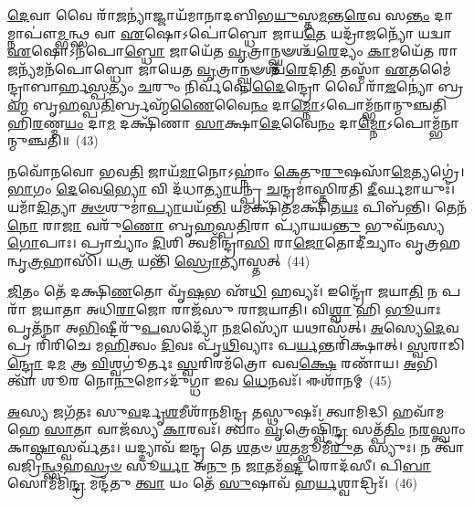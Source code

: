 {\anuvakamend[{\-\ul{𑌪𑍍𑌰}\-\-\ul{𑌵}\-𑌣𑌂 𑌵𑌿\-\ul{𑌷𑍍𑌣𑍁}\-𑌰𑍍𑌵𑌾 \ul{𑌇}\-𑌦\-\ul{𑌮𑌿}\-𑌦\-\ul{𑌮}\-𑌹𑌂 𑌯𑍋 𑌭᳴\-\ul{𑌵}\-𑌤𑍍𑌯𑍇𑌕᳴𑌵𑌿𑍞𑌶𑌤𑌿𑌶𑍍𑌚}]}%

\-\ul{𑌦𑍇}\-𑌵𑌾 𑌵𑍈 𑌰𑌾᳴\-\ul{𑌜}\-𑌨𑍍𑌯𑌾॑𑌜𑍍𑌜𑌾𑌯᳴𑌮𑌾𑌨𑌾𑌦𑌬𑌿𑌭\-\ul{𑌯𑍁}\-𑌸𑍍𑌤\-\ul{𑌮}\-𑌨𑍍𑌤\-\ul{𑌰𑍇}\-𑌵 𑌸\-\ul{𑌨𑍍𑌤𑌂} 𑌦𑌾𑌮𑍍𑌨𑌾𑌪𑍗॑\-\ul{𑌮𑍍𑌭}\-𑌨𑍍𑌥𑍍𑌸 𑌵𑌾 \ul{𑌏}\-𑌷𑍋\-𑌽𑌪𑍋॑𑌬𑍍𑌧𑍋 𑌜𑌾𑌯\-\ul{𑌤𑍇} 𑌯𑌦𑍍𑌰𑌾᳴\-\ul{𑌜}\-𑌨𑍍𑌯𑍋᳴ 𑌯𑌦𑍍𑌵𑌾 \ul{𑌏}\-𑌷𑍋\-𑌽𑌨᳴𑌪𑍋\-\ul{𑌬𑍍𑌧𑍋} 𑌜𑌾𑌯𑍇᳴𑌤 \ul{𑌵𑍃}\-𑌤𑍍𑌰𑌾𑌨𑍍𑌘𑍍𑌨𑍟𑌶𑍍𑌚᳴\-\ul{𑌰𑍇}\-𑌦𑍍𑌯𑌂 \ul{𑌕𑌾}\-𑌮𑌯𑍇᳴𑌤 𑌰𑌾\-\ul{𑌜}\-𑌨𑍍𑌯᳴𑌮𑌨᳴𑌪𑍋𑌬𑍍𑌧𑍋 𑌜𑌾𑌯𑍇𑌤 \ul{𑌵𑍃}\-𑌤𑍍𑌰𑌾𑌨𑍍𑌘𑍍𑌨𑍟𑌶𑍍𑌚᳴\-\ul{𑌰𑍇}\-𑌦𑌿\-\ul{𑌤𑌿} 𑌤𑌸𑍍𑌮𑌾᳴ \ul{𑌏}\-𑌤𑌮𑍈॑𑌨𑍍𑌦𑍍𑌰𑌾𑌬𑌾𑌰𑍍\mbox{}𑌹\-\ul{𑌸𑍍𑌪}\-𑌤𑍍𑌯𑌂 \ul{𑌚}\-𑌰𑍁𑌂 𑌨𑌿𑌰𑍍𑌵᳴𑌪𑍇\-\ul{𑌦𑍈}\-𑌨𑍍𑌦𑍍𑌰𑍋 𑌵𑍈 𑌰𑌾᳴\-\ul{𑌜}\-𑌨𑍍𑌯𑍋॑ 𑌬𑍍𑌰\-\ul{𑌹𑍍𑌮} 𑌬𑍃\-\ul{𑌹}\-𑌸𑍍𑌪\-\ul{𑌤𑌿}\-𑌰𑍍𑌬𑍍𑌰𑌹𑍍𑌮᳴\-\ul{𑌣𑍈}\-𑌵𑍈\-\ul{𑌨𑌂} 𑌦𑌾\-\ul{𑌮𑍍𑌨𑍋}\-\-𑌽𑌪𑍋𑌮𑍍𑌭᳴𑌨𑌾𑌨𑍍𑌮𑍁𑌞𑍍𑌚𑌤𑌿 𑌹𑌿\-\ul{𑌰}\-𑌣𑍍𑌮\-\ul{𑌯𑌂} 𑌦𑌾\-\ul{𑌮} 𑌦𑌕𑍍𑌷𑌿᳴𑌣𑌾 \ul{𑌸𑌾}\-𑌕𑍍𑌷𑌾\-\ul{𑌦𑍇}\-𑌵𑍈\-\ul{𑌨𑌂} 𑌦𑌾\-\ul{𑌮𑍍𑌨𑍋}\-\-𑌽𑌪𑍋𑌮𑍍𑌭᳴𑌨𑌾𑌨𑍍𑌮𑍁𑌞𑍍𑌚𑌤𑌿॥~(43)

{\anuvakamend[{\-\ul{𑌏}\-\-\ul{𑌨𑌂} 𑌦𑍍𑌵𑌾𑌦᳴𑌶 𑌚}]}%

𑌨𑌵𑍋᳴𑌨𑌵𑍋 𑌭𑌵\-\ul{𑌤𑌿} 𑌜𑌾𑌯᳴\-\ul{𑌮𑌾}\-𑌨𑍋\-𑌽𑌹𑍍𑌨𑌾𑌂॑ \ul{𑌕𑍇}\-𑌤𑍁\-\ul{𑌰𑍁}\-𑌷𑌸𑌾᳴\-\ul{𑌮𑍇}\-𑌤𑍍𑌯𑌗𑍍𑌰𑍇॑। \ul{𑌭𑌾}\-𑌗𑌂 \ul{𑌦𑍇}\-𑌵𑍇\-\ul{𑌭𑍍𑌯𑍋} 𑌵𑌿 𑌦᳴𑌧𑌾\-\ul{𑌤𑍍𑌯𑌾}\-𑌯𑌨𑍍𑌪𑍍𑌰 \ul{𑌚}\-𑌨𑍍𑌦𑍍𑌰𑌮𑌾॑𑌸𑍍𑌤𑌿𑌰𑌤𑌿 \ul{𑌦𑍀}\-𑌰𑍍𑌘𑌮𑌾𑌯𑍁𑌃᳴। 𑌯𑌮𑌾᳴\-\ul{𑌦𑌿}\-𑌤𑍍𑌯𑌾 \ul{𑌅}\-\-\ul{𑍞}\-𑌶𑍁𑌮𑌾॑\-\ul{𑌪𑍍𑌯𑌾}\-𑌯𑌯᳴\-\ul{𑌨𑍍𑌤𑌿} 𑌯𑌮𑌕𑍍𑌷𑌿᳴\-\ul{𑌤}\-𑌮𑌕𑍍𑌷𑌿᳴𑌤\-\ul{𑌯𑌃} 𑌪𑌿𑌬᳴𑌨𑍍𑌤𑌿। 𑌤𑍇𑌨᳴ \ul{𑌨𑍋} 𑌰𑌾\-\ul{𑌜𑌾} 𑌵𑌰𑍁᳴\-\ul{𑌣𑍋} 𑌬𑍃\-\ul{𑌹}\-𑌸𑍍𑌪\-\ul{𑌤𑌿}\-𑌰𑌾 𑌪𑍍𑌯𑌾᳴𑌯𑌯\-\ul{𑌨𑍍𑌤𑍁} 𑌭𑍁𑌵᳴𑌨𑌸𑍍𑌯 \ul{𑌗𑍋}\-𑌪𑌾𑌃। 𑌪𑍍𑌰𑌾𑌚𑍍𑌯𑌾𑌂॑ \ul{𑌦𑌿}\-𑌶𑌿 𑌤𑍍𑌵𑌮𑌿᳴𑌨𑍍𑌦𑍍𑌰𑌾\-\ul{𑌸𑌿} 𑌰𑌾\-\ul{𑌜𑍋}\-𑌤𑍋𑌦𑍀॑𑌚𑍍𑌯𑌾𑌂 𑌵𑍃𑌤𑍍𑌰𑌹𑌨𑍍𑌵𑍃\-\ul{𑌤𑍍𑌰}\-𑌹𑌾𑌸𑌿᳴। 𑌯\-\ul{𑌤𑍍𑌰} 𑌯𑌨𑍍𑌤𑌿᳴ \ul{𑌸𑍍𑌰𑍋}\-𑌤𑍍𑌯𑌾𑌸𑍍𑌤𑌤𑍍~(44)

\-\ul{𑌜𑌿}\-𑌤𑌂 𑌤𑍇᳴ 𑌦𑌕𑍍𑌷𑌿\-\ul{𑌣}\-𑌤𑍋 𑌵𑍃᳴\-\ul{𑌷}\-𑌭 𑌏᳴\-\ul{𑌧𑌿} 𑌹𑌵𑍍𑌯𑌃᳴। 𑌇𑌨𑍍𑌦𑍍𑌰𑍋᳴ 𑌜𑌯𑌾\-\ul{𑌤𑌿} 𑌨 𑌪𑌰𑌾᳴ 𑌜𑌯𑌾𑌤𑌾 𑌅𑌧𑌿\-\ul{𑌰𑌾}\-𑌜𑍋 𑌰𑌾𑌜᳴𑌸𑍁 𑌰𑌾𑌜𑌯𑌾𑌤𑌿। 𑌵𑌿\-\ul{𑌶𑍍𑌵𑌾} 𑌹𑌿 \ul{𑌭𑍂}\-𑌯𑌾𑌃 𑌪𑍃𑌤᳴𑌨𑌾 𑌅\-\ul{𑌭𑌿}\-𑌷𑍍𑌟𑍀𑌰𑍁᳴\-\ul{𑌪}\-𑌸𑌦𑍍𑌯𑍋᳴ 𑌨\-\ul{𑌮}\-𑌸𑍍𑌯𑍋᳴ 𑌯𑌥𑌾𑌸᳴𑌤𑍍। \ul{𑌅}\-𑌸𑍍𑌯𑍇\-\ul{𑌦𑍇}\-𑌵 𑌪𑍍𑌰 𑌰𑌿᳴𑌰𑌿𑌚𑍇 𑌮\-\ul{𑌹𑌿}\-𑌤𑍍𑌵𑌂 \ul{𑌦𑌿}\-𑌵𑌃 𑌪𑍃᳴\-\ul{𑌥𑌿}\-𑌵𑍍𑌯𑌾𑌃 𑌪\-\ul{𑌰𑍍𑌯}\-𑌨𑍍𑌤𑌰𑌿᳴𑌕𑍍𑌷𑌾𑌤𑍍। \ul{𑌸𑍍𑌵}\-𑌰𑌾𑌡𑌿\-\ul{𑌨𑍍𑌦𑍍𑌰𑍋} 𑌦\-\ul{𑌮} 𑌆 \ul{𑌵𑌿}\-𑌶𑍍𑌵𑌗𑍂॑𑌰𑍍𑌤𑌃 \ul{𑌸𑍍𑌵}\-𑌰𑌿𑌰𑌮᳴𑌤𑍍𑌰𑍋 𑌵𑌵\-\ul{𑌕𑍍𑌷𑍇} 𑌰𑌣𑌾᳴𑌯। \ul{𑌅}\-𑌭𑌿 𑌤𑍍𑌵𑌾᳴ 𑌶𑍂𑌰 𑌨𑍋\-\ul{𑌨𑍁}\-𑌮𑍋\-𑌽𑌦𑍁᳴𑌗𑍍𑌧𑌾 𑌇𑌵 \ul{𑌧𑍇}\-𑌨𑌵𑌃᳴। 𑌈𑌶𑌾᳴𑌨𑌮𑍍~(45)

\-\ul{𑌅}\-𑌸𑍍𑌯 𑌜𑌗᳴𑌤𑌃 𑌸𑍁\-\ul{𑌵}\-𑌰𑍍𑌦𑍃\-\ul{𑌶}\-𑌮𑍀𑌶𑌾᳴𑌨𑌮𑌿𑌨𑍍𑌦𑍍𑌰 \ul{𑌤}\-𑌸𑍍𑌥𑍁𑌷𑌃᳴। 𑌤𑍍𑌵𑌾𑌮𑌿𑌦𑍍𑌧𑌿 𑌹𑌵𑌾᳴𑌮𑌹𑍇 \ul{𑌸𑌾}\-𑌤𑌾 𑌵𑌾𑌜᳴𑌸𑍍𑌯 \ul{𑌕𑌾}\-𑌰𑌵𑌃᳴। 𑌤𑍍𑌵𑌾𑌂 \ul{𑌵𑍃}\-𑌤𑍍𑌰𑍇𑌷𑍍𑌵𑌿᳴\-\ul{𑌨𑍍𑌦𑍍𑌰} 𑌸𑌤𑍍𑌪᳴\-\ul{𑌤𑌿𑌂} 𑌨\-\ul{𑌰}\-𑌸𑍍𑌤𑍍𑌵𑌾𑌂 𑌕𑌾\-\ul{𑌷𑍍𑌠𑌾}\-𑌸𑍍𑌵𑌰𑍍𑌵᳴𑌤𑌃। 𑌯𑌦𑍍𑌦𑍍𑌯𑌾𑌵᳴ 𑌇𑌨𑍍𑌦𑍍𑌰 𑌤𑍇 \ul{𑌶}\-𑌤𑍞 \ul{𑌶}\-𑌤𑌮𑍍𑌭𑍂𑌮𑍀᳴\-\ul{𑌰𑍁}\-𑌤 𑌸𑍍𑌯𑍁𑌃। 𑌨 𑌤𑍍𑌵𑌾᳴ 𑌵𑌜𑍍𑌰𑌿\-\ul{𑌨𑍍𑌥𑍍𑌸}\-𑌹\-\ul{𑌸𑍍𑌰}\-\-\ul{𑍞} 𑌸𑍂\-\ul{𑌰𑍍𑌯𑌾} 𑌅\-\ul{𑌨𑍁} 𑌨 \ul{𑌜𑌾}\-𑌤𑌮᳴\-\ul{𑌷𑍍𑌟} 𑌰𑍋𑌦᳴𑌸𑍀। 𑌪𑌿\-\ul{𑌬𑌾} 𑌸𑍋𑌮᳴𑌮𑌿\-\ul{𑌨𑍍𑌦𑍍𑌰} 𑌮𑌨𑍍𑌦᳴𑌤𑍁 \ul{𑌤𑍍𑌵𑌾} 𑌯𑌂 𑌤𑍇᳴ \ul{𑌸𑍁}\-𑌷𑌾𑌵᳴ 𑌹\-\ul{𑌰𑍍𑌯}\-𑌶𑍍𑌵𑌾𑌦𑍍𑌰𑌿𑌃᳴।~(46)

